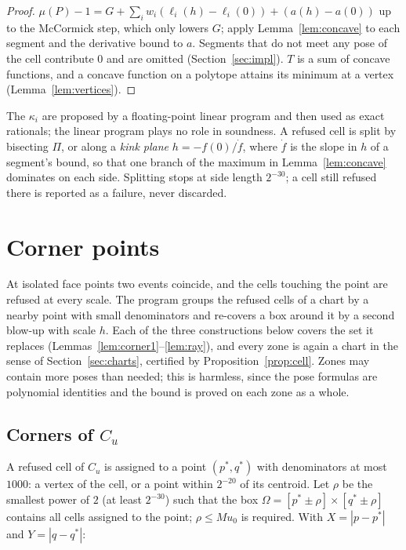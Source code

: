 \documentclass[11pt]{amsart}
\theoremstyle{definition}
\theoremstyle{remark}
\begin{document}
\begin{proof}
$\mu(P)-1=G+\sum_iw_i(\ell_i(h)-\ell_i(0))+(a(h)-a(0))$ up to the McCormick step, which only lowers $G$; apply
Lemma~\ref{lem:concave} to each segment and the derivative bound to $a$. Segments that do not meet any pose of the
cell contribute $0$ and are omitted (Section~\ref{sec:impl}). $T$ is a sum of concave functions, and a concave function
on a polytope attains its minimum at a vertex (Lemma~\ref{lem:vertices}).
\end{proof}

The $\kappa_i$ are proposed by a floating-point linear program and then used as exact rationals; the linear program
plays no role in soundness. A refused cell is split by bisecting $\Pi$, or along a \emph{kink plane}
$h=-f(0)/\dot f$, where $\dot f$ is the slope in $h$ of a segment's bound, so that one branch of the maximum in
Lemma~\ref{lem:concave} dominates on each side. Splitting stops at side length $2^{-30}$; a cell still refused there
is reported as a failure, never discarded.

\section{Corner points}\label{sec:corners}

At isolated face points two events coincide, and the cells touching the point are refused at every scale. The
program groups the refused cells of a chart by a nearby point with small denominators and re-covers a box around it
by a second blow-up with scale $h$. Each of the three constructions below covers the set it replaces
(Lemmas~\ref{lem:corner1}--\ref{lem:ray}), and every zone is again a chart in the sense of Section~\ref{sec:charts},
certified by Proposition~\ref{prop:cell}. Zones may contain more poses than needed; this is harmless, since the pose
formulas are polynomial identities and the bound is proved on each zone as a whole.

\subsection{Corners of $C_u$}
A refused cell of $C_u$ is assigned to a point $(p^*,q^*)$ with denominators at most $1000$: a vertex of the cell, or
a point within $2^{-20}$ of its centroid. Let $\rho$ be the smallest power of $2$ (at least $2^{-30}$) such that the box
$\Omega=[p^*\pm\rho]\times[q^*\pm\rho]$ contains all cells assigned to the point; $\rho\le Mu_0$ is required. With
$X=|p-p^*|$ and $Y=|q-q^*|$:
\end{document}
